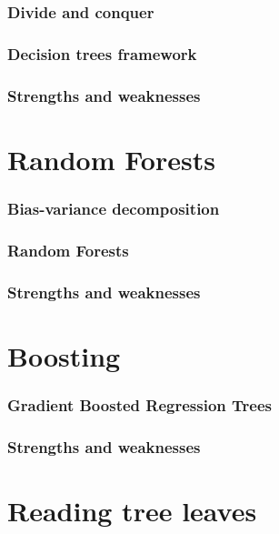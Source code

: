 \documentclass{beamer}
\begin{document}
\begin{frame}
  \frametitle{Divide and conquer}
\end{frame}

\begin{frame}
  \frametitle{Decision trees framework}
\end{frame}

\begin{frame}
  \frametitle{Strengths and weaknesses}
\end{frame}



\section{Random Forests}

\begin{frame}
  \frametitle{Bias-variance decomposition}
\end{frame}

\begin{frame}
  \frametitle{Random Forests}
\end{frame}

\begin{frame}
  \frametitle{Strengths and weaknesses}
\end{frame}



\section{Boosting}

\begin{frame}
  \frametitle{Gradient Boosted Regression Trees}
\end{frame}

\begin{frame}
  \frametitle{Strengths and weaknesses}
\end{frame}




\section{Reading tree leaves}
\end{document}
